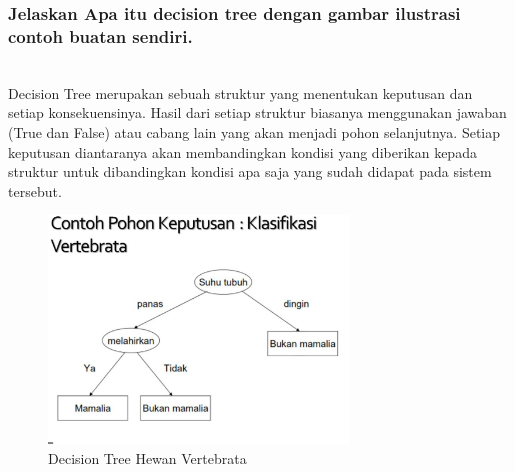 \subsubsection{Jelaskan Apa itu decision tree dengan gambar ilustrasi contoh buatan sendiri.}
\hfill\\
Decision Tree merupakan sebuah struktur yang menentukan keputusan dan setiap konsekuensinya. Hasil dari setiap struktur biasanya menggunakan jawaban (True dan False) atau cabang lain yang akan menjadi pohon selanjutnya. Setiap keputusan diantaranya akan membandingkan kondisi yang diberikan kepada struktur untuk dibandingkan kondisi apa saja yang sudah didapat pada sistem tersebut.
\begin{figure}[H]
    \includegraphics[width=8cm]{figures/1174077/2/dt.png}
    \centering
    \caption{Decision Tree Hewan Vertebrata}
\end{figure}


